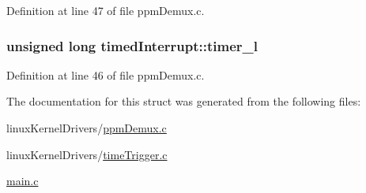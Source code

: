Definition at line 47 of file ppm\+Demux.\+c.

\hypertarget{structtimedInterrupt_ac3d76cbc80f17f677b307910b5c0da97_ac3d76cbc80f17f677b307910b5c0da97}{
\subsubsection[{timer\+\_\+l}]{\setlength{\rightskip}{0pt plus 5cm}unsigned long timed\+Interrupt\+::timer\+\_\+l}}\label{structtimedInterrupt_ac3d76cbc80f17f677b307910b5c0da97_ac3d76cbc80f17f677b307910b5c0da97}


Definition at line 46 of file ppm\+Demux.\+c.



The documentation for this struct was generated from the following files\+:\begin{DoxyCompactItemize}
\item 
linux\+Kernel\+Drivers/\hyperlink{ppmDemux_8c}{ppm\+Demux.\+c}\item 
linux\+Kernel\+Drivers/\hyperlink{timeTrigger_8c}{time\+Trigger.\+c}\item 
\hyperlink{main_8c}{main.\+c}\end{DoxyCompactItemize}
